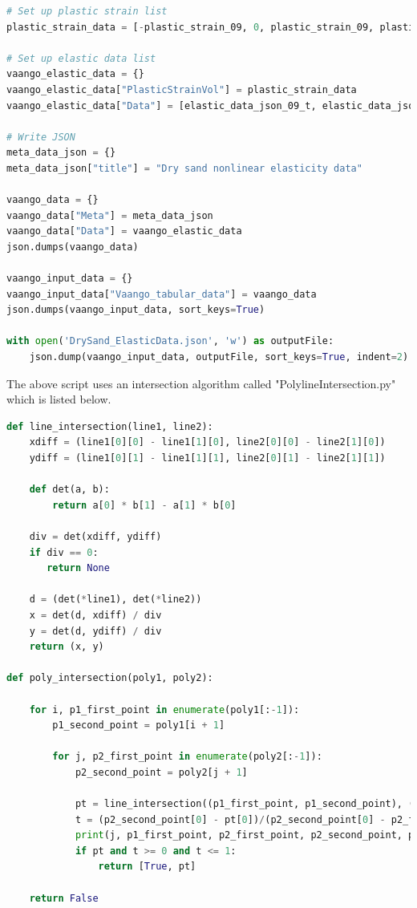 \begin{lstlisting}[language=Python]
# Set up plastic strain list
plastic_strain_data = [-plastic_strain_09, 0, plastic_strain_09, plastic_strain_18, plastic_strain_27, plastic_strain_36, plastic_strain_45]

# Set up elastic data list
vaango_elastic_data = {}
vaango_elastic_data["PlasticStrainVol"] = plastic_strain_data
vaango_elastic_data["Data"] = [elastic_data_json_09_t, elastic_data_json_00, elastic_data_json_09, elastic_data_json_18, elastic_data_json_27, elastic_data_json_36, elastic_data_json_45]

# Write JSON
meta_data_json = {}
meta_data_json["title"] = "Dry sand nonlinear elasticity data"

vaango_data = {}
vaango_data["Meta"] = meta_data_json
vaango_data["Data"] = vaango_elastic_data
json.dumps(vaango_data)

vaango_input_data = {}
vaango_input_data["Vaango_tabular_data"] = vaango_data
json.dumps(vaango_input_data, sort_keys=True)

with open('DrySand_ElasticData.json', 'w') as outputFile:
    json.dump(vaango_input_data, outputFile, sort_keys=True, indent=2)
\end{lstlisting}

The above script uses an intersection algorithm called "PolylineIntersection.py" which is listed below.
\begin{lstlisting}[language=Python]
def line_intersection(line1, line2):
    xdiff = (line1[0][0] - line1[1][0], line2[0][0] - line2[1][0])
    ydiff = (line1[0][1] - line1[1][1], line2[0][1] - line2[1][1])

    def det(a, b):
        return a[0] * b[1] - a[1] * b[0]

    div = det(xdiff, ydiff)
    if div == 0:
       return None

    d = (det(*line1), det(*line2))
    x = det(d, xdiff) / div
    y = det(d, ydiff) / div
    return (x, y)

def poly_intersection(poly1, poly2):

    for i, p1_first_point in enumerate(poly1[:-1]):
        p1_second_point = poly1[i + 1]

        for j, p2_first_point in enumerate(poly2[:-1]):
            p2_second_point = poly2[j + 1]

            pt = line_intersection((p1_first_point, p1_second_point), (p2_first_point, p2_second_point))
            t = (p2_second_point[0] - pt[0])/(p2_second_point[0] - p2_first_point[0])
            print(j, p1_first_point, p2_first_point, p2_second_point, pt, t)
            if pt and t >= 0 and t <= 1:
                return [True, pt]

    return False
\end{lstlisting}


